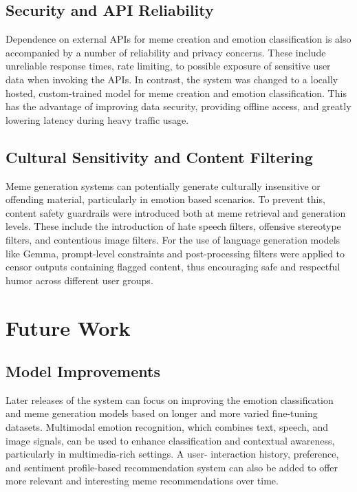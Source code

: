 \documentclass[conference]{IEEEtran}
\begin{document}
\subsection{Security and API Reliability}
Dependence on external APIs for meme creation and emotion classification is also accompanied by a number of reliability and privacy concerns. These include unreliable response times, rate limiting, to possible exposure of sensitive user data when invoking the APIs. In contrast, the system was changed to a locally hosted, custom-trained model for meme creation and emotion classification. This has the advantage of improving data security, providing offline access, and greatly lowering latency during heavy traffic usage.

\subsection{Cultural Sensitivity and Content Filtering}
Meme generation systems can potentially generate culturally insensitive or offending material, particularly in emotion based scenarios. To prevent this, content safety guardrails
were introduced both at meme retrieval and generation levels. These include the introduction of hate speech filters, offensive stereotype filters, and contentious image filters. For the use of language generation models like Gemma, prompt-level constraints and post-processing filters were applied to censor outputs containing flagged content, thus encouraging safe and respectful humor across different user groups.

%

\section{Future Work}
\subsection{Model Improvements}
Later releases of the system can focus on improving the emotion classification and meme generation models based on longer and more varied fine-tuning datasets. Multimodal emotion recognition, which combines text, speech, and image signals, can be used to enhance classification and contextual awareness, particularly in multimedia-rich settings. A user- interaction history, preference, and sentiment profile-based recommendation system can also be added to offer more relevant and interesting meme recommendations over time.
\end{document}
